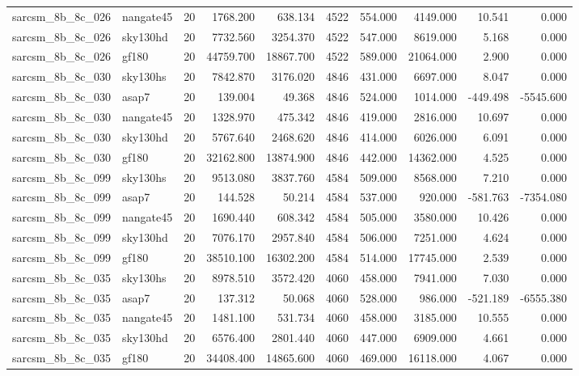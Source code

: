 \begin{tabular}{llrrrrrrrr}
sarcsm\_8b\_8c\_026 & nangate45 & 20 & 1768.200 & 638.134 & 4522 & 554.000 & 4149.000 & 10.541 & 0.000 \\
sarcsm\_8b\_8c\_026 & sky130hd & 20 & 7732.560 & 3254.370 & 4522 & 547.000 & 8619.000 & 5.168 & 0.000 \\
sarcsm\_8b\_8c\_026 & gf180 & 20 & 44759.700 & 18867.700 & 4522 & 589.000 & 21064.000 & 2.900 & 0.000 \\
sarcsm\_8b\_8c\_030 & sky130hs & 20 & 7842.870 & 3176.020 & 4846 & 431.000 & 6697.000 & 8.047 & 0.000 \\
sarcsm\_8b\_8c\_030 & asap7 & 20 & 139.004 & 49.368 & 4846 & 524.000 & 1014.000 & -449.498 & -5545.600 \\
sarcsm\_8b\_8c\_030 & nangate45 & 20 & 1328.970 & 475.342 & 4846 & 419.000 & 2816.000 & 10.697 & 0.000 \\
sarcsm\_8b\_8c\_030 & sky130hd & 20 & 5767.640 & 2468.620 & 4846 & 414.000 & 6026.000 & 6.091 & 0.000 \\
sarcsm\_8b\_8c\_030 & gf180 & 20 & 32162.800 & 13874.900 & 4846 & 442.000 & 14362.000 & 4.525 & 0.000 \\
sarcsm\_8b\_8c\_099 & sky130hs & 20 & 9513.080 & 3837.760 & 4584 & 509.000 & 8568.000 & 7.210 & 0.000 \\
sarcsm\_8b\_8c\_099 & asap7 & 20 & 144.528 & 50.214 & 4584 & 537.000 & 920.000 & -581.763 & -7354.080 \\
sarcsm\_8b\_8c\_099 & nangate45 & 20 & 1690.440 & 608.342 & 4584 & 505.000 & 3580.000 & 10.426 & 0.000 \\
sarcsm\_8b\_8c\_099 & sky130hd & 20 & 7076.170 & 2957.840 & 4584 & 506.000 & 7251.000 & 4.624 & 0.000 \\
sarcsm\_8b\_8c\_099 & gf180 & 20 & 38510.100 & 16302.200 & 4584 & 514.000 & 17745.000 & 2.539 & 0.000 \\
sarcsm\_8b\_8c\_035 & sky130hs & 20 & 8978.510 & 3572.420 & 4060 & 458.000 & 7941.000 & 7.030 & 0.000 \\
sarcsm\_8b\_8c\_035 & asap7 & 20 & 137.312 & 50.068 & 4060 & 528.000 & 986.000 & -521.189 & -6555.380 \\
sarcsm\_8b\_8c\_035 & nangate45 & 20 & 1481.100 & 531.734 & 4060 & 458.000 & 3185.000 & 10.555 & 0.000 \\
sarcsm\_8b\_8c\_035 & sky130hd & 20 & 6576.400 & 2801.440 & 4060 & 447.000 & 6909.000 & 4.661 & 0.000 \\
sarcsm\_8b\_8c\_035 & gf180 & 20 & 34408.400 & 14865.600 & 4060 & 469.000 & 16118.000 & 4.067 & 0.000 \\

\end{tabular}
